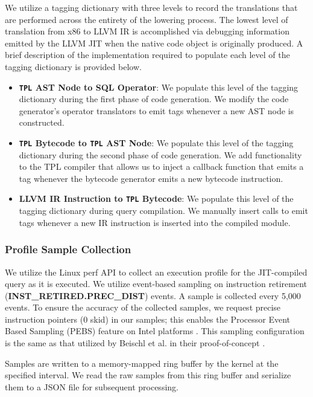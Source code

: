 \documentclass{vldb}
\newcommand{\tpl}{\texttt{TPL}\xspace}
\newcommand{\dbCode}[1]{{\sffamily\small \textbf{#1}}\xspace}
\begin{document}
We utilize a tagging dictionary with three levels to record the translations that are performed across the entirety of the lowering process. The lowest level of translation from x86 to LLVM IR is accomplished via debugging information emitted by the LLVM JIT when the native code object is originally produced. A brief description of the implementation required to populate each level of the tagging dictionary is provided below.
\begin{itemize}
    \item \textbf{\tpl AST Node to SQL Operator}: We populate this level of the tagging dictionary during the first phase of code generation. We modify the code generator’s operator translators to emit tags whenever a new AST node is constructed.
    \item \textbf{\tpl Bytecode to \tpl AST Node}: We populate this level of the tagging dictionary during the second phase of code generation. We add functionality to the TPL compiler that allows us to inject a callback function that emits a tag whenever the bytecode generator emits a new bytecode instruction.
    \item \textbf{LLVM IR Instruction to \tpl Bytecode}: We populate this level of the tagging dictionary during query compilation. We manually insert calls to emit tags whenever a new IR instruction is inserted into the compiled module.
\end{itemize}

\subsubsection{Profile Sample Collection}

We utilize the Linux perf API to collect an execution profile for the JIT-compiled query as it is executed. We utilize event-based sampling on instruction retirement (\dbCode{INST\_RETIRED.PREC\_DIST}) events. A sample is collected every 5,000 events. To ensure the accuracy of the collected samples, we request precise instruction pointers (0 skid) in our samples; this enables the Processor Event Based Sampling (PEBS) feature on Intel platforms \cite{intelmanual}. This sampling configuration is the same as that utilized by Beischl et al. in their proof-of-concept \cite{beischl21}.

Samples are written to a memory-mapped ring buffer by the kernel at the specified interval. We read the raw samples from this ring buffer and serialize them to a JSON file for subsequent processing.
\end{document}
